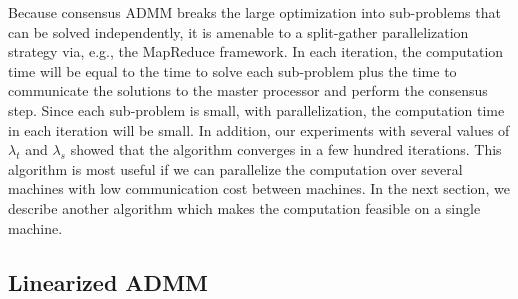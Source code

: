\documentclass[letterpaper]{article} %
\newcommand{\attn}[1]{\textcolor{red}{TODO: #1}}
\begin{document}
Because consensus ADMM breaks the large optimization into
sub-problems that can be solved independently, it is amenable to a
split-gather parallelization strategy via, e.g., the MapReduce framework.
In each iteration, the
computation time will be equal to the time to solve each sub-problem
plus the time to communicate the solutions to the master processor
and perform the consensus step. Since each sub-problem is
small, with parallelization, the computation time in each iteration
will be small. In addition, our experiments with several values of
$\lambda_t$ and $\lambda_s$ showed that the algorithm converges in a few
hundred iterations. 
This algorithm is most useful if we can parallelize the
computation over several machines with low communication cost between
machines. In the next section, we describe 
another algorithm which makes the computation feasible on a single
machine. 

\subsection{Linearized ADMM}
\label{sec:linADMM}

\end{document}
